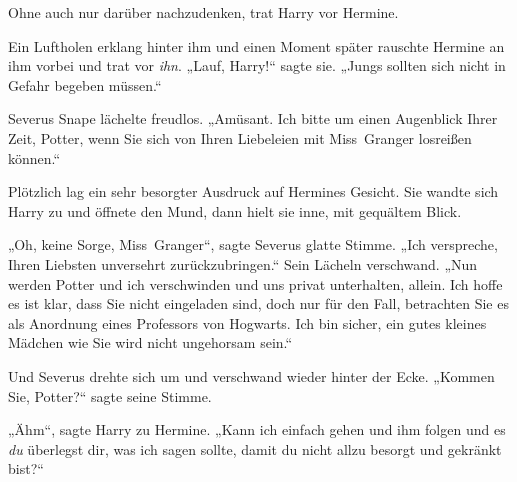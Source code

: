 Ohne auch nur darüber nachzudenken, trat Harry vor Hermine.

Ein Luftholen erklang hinter ihm und einen Moment später rauschte Hermine an ihm vorbei und trat vor \emph{ihn}. „Lauf, Harry!“ sagte sie. „Jungs sollten sich nicht in Gefahr begeben müssen.“

Severus Snape lächelte freudlos. „Amüsant. Ich bitte um einen Augenblick Ihrer Zeit, Potter, wenn Sie sich von Ihren Liebeleien mit Miss~Granger losreißen können.“

Plötzlich lag ein sehr besorgter Ausdruck auf Hermines Gesicht. Sie wandte sich Harry zu und öffnete den Mund, dann hielt sie inne, mit gequältem Blick.

„Oh, keine Sorge, Miss~Granger“, sagte Severus glatte Stimme. „Ich verspreche, Ihren Liebsten unversehrt zurückzubringen.“ Sein Lächeln verschwand. „Nun werden Potter und ich verschwinden und uns privat unterhalten, allein. Ich hoffe es ist klar, dass Sie nicht eingeladen sind, doch nur für den Fall, betrachten Sie es als Anordnung eines Professors von Hogwarts. Ich bin sicher, ein gutes kleines Mädchen wie Sie wird nicht ungehorsam sein.“

Und Severus drehte sich um und verschwand wieder hinter der Ecke. „Kommen Sie, Potter?“ sagte seine Stimme.

„Ähm“, sagte Harry zu Hermine. „Kann ich einfach gehen und ihm folgen und es \emph{du} überlegst dir, was ich sagen sollte, damit du nicht allzu besorgt und gekränkt bist?“

